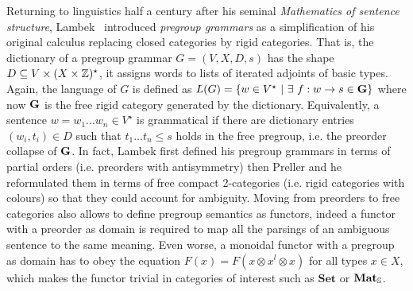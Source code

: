 Returning to linguistics half a century after his seminal \emph{Mathematics of sentence structure}, Lambek~\cite{Lambek99,Lambek01,Lambek08} introduced \emph{pregroup grammars} as a simplification of his original calculus replacing closed categories by rigid categories.
That is, the dictionary of a pregroup grammar $G = (V, X, D, s)$ has the shape $D \sub V \times (X \times \Z)^\star$, it assigns words to lists of iterated adjoints of basic types.
Again, the language of $G$ is defined as $L(G) = \{ w \in V^\star \ \vert \ \exists \ f : w \to s \in \G \}$ where now $\G$ is the free rigid category generated by the dictionary.
Equivalently, a sentence $w = w_1 \dots w_n \in V^\star$ is grammatical if there are dictionary entries $(w_i, t_i) \in D$ such that $t_1 \dots t_n \leq s$ holds in the free pregroup, i.e. the preorder collapse of $\G$.
In fact, Lambek first defined his pregroup grammars in terms of partial orders (i.e. preorders with antisymmetry) then Preller and he~\cite{PrellerLambek07} reformulated them in terms of free compact 2-categories (i.e. rigid categories with colours) so that they could account for ambiguity.
Moving from preorders to free categories also allows to define pregroup semantics as functors, indeed a functor with a preorder as domain is required to map all the parsings of an ambiguous sentence to the same meaning.
Even worse, a monoidal functor with a pregroup as domain has to obey the equation $F(x) = F(x \otimes x^l \otimes x)$ for all types $x \in X$, which makes the functor trivial in categories of interest such as $\mathbf{Set}$ or $\mathbf{Mat}_\S$.

